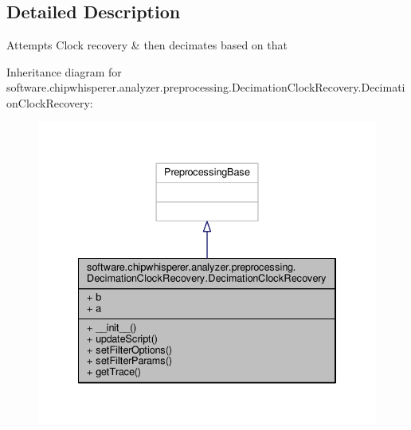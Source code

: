 \subsection{Detailed Description}
\begin{DoxyVerb}Attempts Clock recovery & then decimates based on that
\end{DoxyVerb}
 

Inheritance diagram for software.\+chipwhisperer.\+analyzer.\+preprocessing.\+Decimation\+Clock\+Recovery.\+Decimation\+Clock\+Recovery\+:\nopagebreak
\begin{figure}[H]
\begin{center}
\leavevmode
\includegraphics[width=334pt]{dc/dc4/classsoftware_1_1chipwhisperer_1_1analyzer_1_1preprocessing_1_1DecimationClockRecovery_1_1Decima9417a01eeff3fab8dc28a8a8a018b715}
\end{center}
\end{figure}


